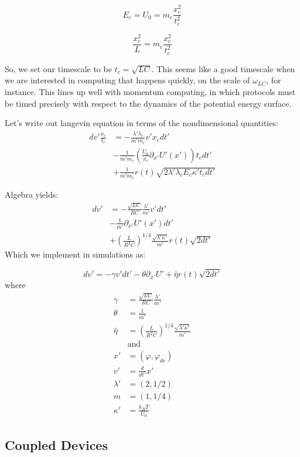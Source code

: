 \documentclass[paper=a4, twocolumn, fontsize=10pt]{article} %
\numberwithin{equation}{section} %
\numberwithin{figure}{section} %
\numberwithin{table}{section} %
\def \df#1{\hat{#1}}
\def \dl#1{#1}
\begin{document}
\[ E_c = U_0 = m_c \frac{ x^2_c}{t^2_c} \]

\[ \frac{x_c^2}{L} = m_c \frac{ x^2_c}{t^2_c} \]

So, we set our timescale to be $t_c = \sqrt{LC} $. This seems like a good timescale when we are interested in computing that happens quickly, on the scale of $\omega_{LC}$, for instance. This lines up well with momentum computing, in which protocols must be timed precisely with respect to the dynamics of the potential energy surface.


Let's write out langevin equation in terms of the nondimensional quantities:
\begin{align*}
dv' \frac{x_c}{t_c} &= -\frac{\lambda' \lambda_c}{m' m_c} v' x_c  dt' \\
 &- \frac{1}{m' m_c} \left(\frac{U_0}{x_c} \partial_{x'} U'(x')\right)  t_c dt' \\
  &+ \frac{1}{m'm_c} r(t)\sqrt{2\lambda'\lambda_c E_c \kappa' t_c dt'}
\end{align*}
    
Algebra yields:
\begin{align*}
dv' &= -\frac{\sqrt{LC} }{ RC} \frac{\lambda'}{m'} v' dt' \\
&- \frac{1 }{ m'}  \partial_{x'} U'(x') dt' \\
&+ \left(  \frac{L}{R^2 C} \right)^{1/4} \frac{\sqrt{\lambda'\kappa'}}{m'} r(t) \sqrt {2 dt'}
\end{align*}
Which we implement in simulations as:

 \[ dv' = -\gamma v' dt' - \theta \partial_{x'} U' + \df\eta r(t) \sqrt{2dt'} \]
where
\begin{align*}
    \gamma &=  \frac{\sqrt{LC} }{ RC} \frac{\lambda'}{m'}  \\
    \theta &= \frac{1 }{ m'} \\
    \df\eta &= \left(  \frac{L}{R^2 C} \right)^{1/4} \frac{\sqrt{\lambda'\kappa'}}{m'} \\
    &\text{and} \\
    x' &= (\dl\varphi, \dl\varphi_{dc}) \\
    v' &= \frac{d}{dt'} x' \\
    \lambda' &= (2, 1/2) \\
    m &= ( 1, 1/4) \\
    \kappa' &= \frac{k_B T}{U_0}
\end{align*}

\subsection{Coupled Devices}
\end{document}
